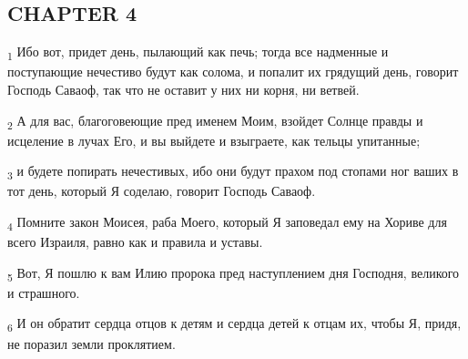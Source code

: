 \subsection{CHAPTER 4}
\begin{tcolorbox}
\textsubscript{1} Ибо вот, придет день, пылающий как печь; тогда все надменные и поступающие нечестиво будут как солома, и попалит их грядущий день, говорит Господь Саваоф, так что не оставит у них ни корня, ни ветвей.
\end{tcolorbox}
\begin{tcolorbox}
\textsubscript{2} А для вас, благоговеющие пред именем Моим, взойдет Солнце правды и исцеление в лучах Его, и вы выйдете и взыграете, как тельцы упитанные;
\end{tcolorbox}
\begin{tcolorbox}
\textsubscript{3} и будете попирать нечестивых, ибо они будут прахом под стопами ног ваших в тот день, который Я соделаю, говорит Господь Саваоф.
\end{tcolorbox}
\begin{tcolorbox}
\textsubscript{4} Помните закон Моисея, раба Моего, который Я заповедал ему на Хориве для всего Израиля, равно как и правила и уставы.
\end{tcolorbox}
\begin{tcolorbox}
\textsubscript{5} Вот, Я пошлю к вам Илию пророка пред наступлением дня Господня, великого и страшного.
\end{tcolorbox}
\begin{tcolorbox}
\textsubscript{6} И он обратит сердца отцов к детям и сердца детей к отцам их, чтобы Я, придя, не поразил земли проклятием.
\end{tcolorbox}
